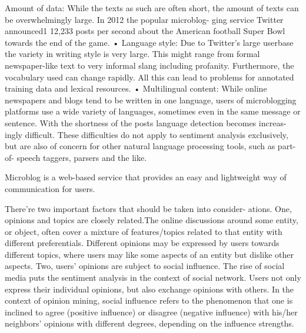 \documentclass[twocolumn]{svjour3}          %
\begin{document}
Amount of data: While the texts as such are often short, the amount of texts can be overwhelmingly large. In 2012 the popular microblog-
ging service Twitter announced1 12,233 posts per second about the American football Super Bowl towards the end of the game.
• Language style: Due to Twitter’s large userbase the variety in writing style is very large. This might range from formal newspaper-like text to
very informal slang including profanity. Furthermore, the vocabulary used can change rapidly. All this can lead to problems for annotated training data and lexical resources.
• Multilingual content: While online newspapers and blogs tend to be written in one language, users of microblogging platforms use a wide variety of languages, sometimes even in the same message or sentence. With the shortness of the posts language detection becomes increas- ingly difficult.
These difficulties do not apply to sentiment analysis exclusively, but are also of concern for other natural language processing tools, such as part-of- speech taggers, parsers and the like.


Microblog is a web-based service that provides an easy and lightweight way of communication for users.

There’re two important factors that should be taken into consider- ations. One, opinions and topics are closely related.The online discussions around some entity, or object, often cover a mixture of features/topics related to that entity with different preferentials. Different opinions may be expressed by users towards different topics, where users may like some aspects of an entity but dislike other aspects. Two, users’ opinions are subject to social influence. The rise of social media puts the sentiment analysis in the context of social network. Users not only express their individual opinions, but also exchange opinions with others. In the context of opinion mining, social influence refers to the phenomenon that one is inclined to agree (positive influence) or disagree (negative influence) with his/her neighbors’ opinions with different degrees, depending on the influence strengths.\cite{li2012mining}
\end{document}
